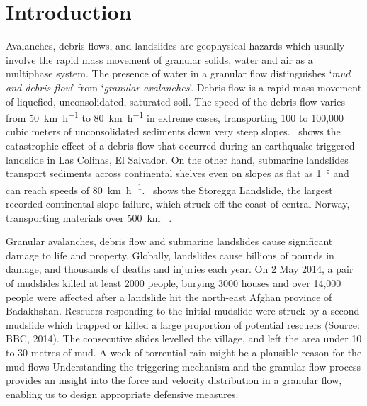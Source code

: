 \chapter{Introduction}

\ifpdf
    \graphicspath{{Chapter1/figs/raster/}{Chapter1/figs/pdf/}{Chapter1/figs/}}
\else
    \graphicspath{{Chapter1/figs/vector/}{Chapter1/figs/}}
\fi

Avalanches, debris flows, and landslides are geophysical hazards which usually 
involve the rapid mass movement of granular solids, water and air as a 
multiphase system.
The presence of water in a granular flow distinguishes `\textit{mud and debris 
flow}' from `\textit{granular avalanches}'. Debris flow is a rapid mass 
movement of liquefied, unconsolidated, saturated soil. The speed of the debris 
flow varies from \SI{50}{\km\per\hour} to \SI{80}{\km\per\hour} in extreme 
cases, transporting 100 to 100,000 cubic meters of unconsolidated sediments 
down very 
steep slopes.~ shows the catastrophic effect of a debris flow 
that occurred during an earthquake-triggered landslide in Las Colinas,  El 
Salvador. On the other hand, submarine landslides transport sediments across 
continental shelves even on slopes as flat as \SI{1}{\degree} and can reach 
speeds of \SI{80}{\km\per\hour}.~ shows the Storegga 
Landslide, the largest recorded continental slope failure, which struck off the 
coast of central Norway, transporting materials over \SI{500}{\km} 
~\citep{Ward2002}. 

Granular avalanches, debris flow and submarine landslides cause significant 
damage to life and property. Globally, landslides cause billions of pounds in 
damage, and thousands of deaths and injuries each year. On 2 May 2014, a pair 
of mudslides killed at least 2000 people, burying 3000 houses and over 14,000 
people were affected after a landslide hit the north-east Afghan province of 
Badakhshan. Rescuers responding to the initial mudslide were struck by a second 
mudslide which trapped or killed a large proportion of potential rescuers 
(Source: BBC, 2014). The consecutive slides levelled the village, and left the 
area under 10 to 30 metres of mud. A week of torrential rain might be a 
plausible reason for the mud flows Understanding the triggering mechanism and 
the granular flow process provides an insight into the force and velocity 
distribution in a granular flow, enabling us to design appropriate defensive 
measures. 

